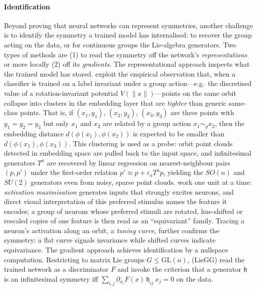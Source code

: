 \documentclass[mathematics,review,submit,moreauthors]{Definitions/mdpi}
\begin{document}
\paragraph{Identification}\label{par:identification-anchor}
Beyond proving that neural networks can represent symmetries, another challenge is to identify the symmetry a trained model has internalised: to recover the group acting on the data, or for continuous groups the Lie-algebra generators.
Two types of methods are (1) to read the symmetry off the network's \emph{representations} or more locally (2) off its \emph{gradients}.\newline
The representational approach inspects what the trained model has stored.
\citet{krippendorf2020} exploit the empirical observation that, when a classifier is trained on a label invariant under a group action---e.g.\ the discretised value of a rotation-invariant potential $V(\|x\|)$---points on the same orbit collapse into clusters in the embedding layer that are \emph{tighter} than generic same-class points.
That is, if $(x_1, y_1)$, $(x_2, y_2)$, $(x_3, y_3)$ are three points with $y_1 = y_2 = y_3$ but only $x_1$ and $x_2$ are related by a group action $x_1\sim_g x_2$, then the embedding distance $d(\phi(x_1), \phi(x_2))$ is expected to be smaller than $d(\phi(x_1), \phi(x_3))$.
This clustering is used as a probe: orbit point clouds detected in embedding space are pulled back to the input space, and infinitesimal generators $T^a$ are recovered by linear regression on nearest-neighbour pairs $(p,p')$ under the first-order relation $p' \approx p + \varepsilon_a T^a p$, yielding the $SO(n)$ and $SU(2)$ generators even from noisy, sparse point clouds.
\citet{olah2020d} work one unit at a time: \emph{activation maximisation} generates inputs that strongly excites neurons, and direct visual interpretation of this preferred stimulus names the feature it encodes; a group of neurons whose preferred stimuli are rotated, hue-shifted or rescaled copies of one feature is then read as an ``equivariant'' family.
Tracing a neuron's activation along an orbit, a \emph{tuning curve}, further confirms the symmetry: a flat curve signals invariance while shifted curves indicate equivariance.\newline
The gradient approach achieves identification by a nullspace computation.
Restricting to matrix Lie groups $G \leq \mathrm{GL}(n)$, \citet{moskalev2023} (LieGG) read the trained network as a discriminator $F$ and invoke the criterion that a generator $\mathfrak{h}$ is an infinitesimal symmetry iff $\sum_{i,j} \partial_{x_i} F(x)\,\mathfrak{h}_{ij}\, x_j = 0$ on the data.
\end{document}
